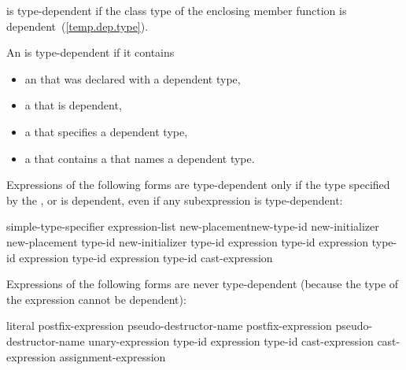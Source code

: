 \pnum
{}
is type-dependent if the class type of the enclosing member function is
dependent~(\ref{temp.dep.type}).

\pnum
An
is type-dependent if it contains

\begin{itemize}
\item
an
that was declared with a dependent type,

\item
a
that is dependent,

\item
a
that specifies a dependent type,

\item
a
that contains a
that names a dependent type.
\end{itemize}

Expressions of the following forms are type-dependent only if the type
specified by the
,
or
is dependent, even if any subexpression is type-dependent:

\begin{ncbnftab}
simple-type-specifier \terminal{(} expression-list\opt \terminal{)}\br
{} new-placement\opt new-type-id new-initializer\opt\br
{} new-placement\opt \terminal{(} type-id \terminal{)} new-initializer\opt\br
{} type-id \terminal{> (} expression \terminal{)}\br
{} type-id \terminal{> (} expression \terminal{)}\br
{} type-id \terminal{> (} expression \terminal{)}\br
{} type-id \terminal{> (} expression \terminal{)}\br
\terminal{(} type-id \terminal{)} cast-expression
\end{ncbnftab}

\pnum
Expressions of the following forms are never type-dependent (because the type
of the expression cannot be dependent):

\begin{ncbnftab}
literal\br
postfix-expression  pseudo-destructor-name\br
postfix-expression \terminal{->} pseudo-destructor-name\br
{} unary-expression\br
{} type-id \terminal{)}\br
{} expression \terminal{)}\br
{} type-id \terminal{)}\br
{} cast-expression\br
{} cast-expression\br
{} assignment-expression\opt
\end{ncbnftab}


